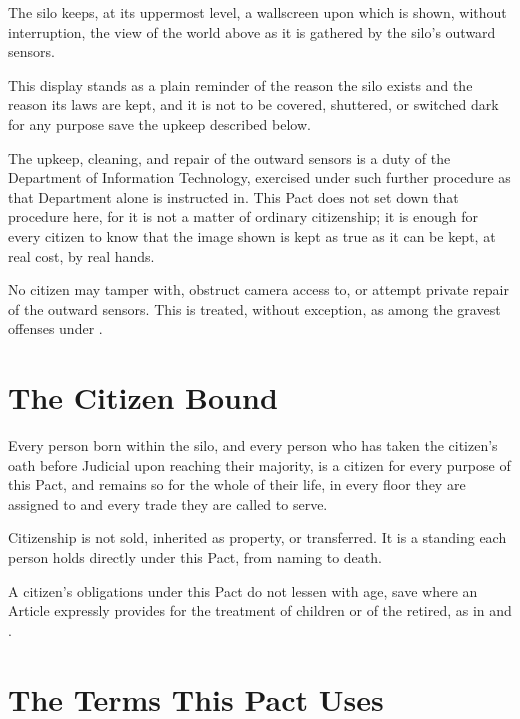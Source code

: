 The silo keeps, at its uppermost level, a wallscreen upon which is shown, without interruption, the view of the world above as it is gathered by the silo's outward sensors.

\begin{clauses}
\item This display stands as a plain reminder of the reason the silo exists and the reason its laws are kept, and it is not to be covered, shuttered, or switched dark for any purpose save the upkeep described below.
\item The upkeep, cleaning, and repair of the outward sensors is a duty of the Department of Information Technology, exercised under such further procedure as that Department alone is instructed in. This Pact does not set down that procedure here, for it is not a matter of ordinary citizenship; it is enough for every citizen to know that the image shown is kept as true as it can be kept, at real cost, by real hands.
\item No citizen may tamper with, obstruct camera access to, or attempt private repair of the outward sensors. This is treated, without exception, as among the gravest offenses under .
\end{clauses}

\section{The Citizen Bound}
\label{sec:founding:citizen-bound}

Every person born within the silo, and every person who has taken the citizen's oath before Judicial upon reaching their majority, is a citizen for every purpose of this Pact, and remains so for the whole of their life, in every floor they are assigned to and every trade they are called to serve.

\begin{clauses}
\item Citizenship is not sold, inherited as property, or transferred. It is a standing each person holds directly under this Pact, from naming to death.
\item A citizen's obligations under this Pact do not lessen with age, save where an Article expressly provides for the treatment of children or of the retired, as in  and .
\end{clauses}

\section{The Terms This Pact Uses}
\label{sec:founding:terms-this-pact-uses}

